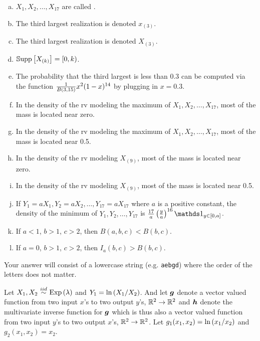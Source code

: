 \documentclass[12pt,landscape]{article}
\newcommand{\instr}{\small Your answer will consist of a lowercase string (e.g. \texttt{aebgd}) where the order of the letters does not matter. \normalsize}
\begin{document}
\begin{enumerate}[(a)]
\item $X_1, X_2, \ldots, X_{17}$ are called .
\item The third largest realization is denoted $x_{(3)}$.
\item The third largest realization is denoted $X_{(3)}$.
\item $\mathbb{S}\text{upp}\left[X_{(k)}\right] = [0, k)$.
\item The probability that the third largest is less than 0.3 can be computed via the function $\frac{1}{B(3, 15)}x^2 (1-x)^{14}$ by plugging in $x=0.3$.
\item In the density of the rv modeling the maximum of $X_1, X_2, \ldots, X_{17}$, most of the mass is located near zero.
\item In the density of the rv modeling the maximum of $X_1, X_2, \ldots, X_{17}$, most of the mass is located near 0.5.
\item In the density of the rv modeling $X_{(9)}$, most of the mass is located near zero.
\item In the density of the rv modeling $X_{(9)}$, most of the mass is located near 0.5.
\item If $Y_1 = aX_1, Y_2 = aX_2, \ldots, Y_{17} = aX_{17}$ where $a$ is a positive constant, the density of the minimum of $Y_1, Y_2, \ldots, Y_{17}$ is $\frac{17}{a}\tothepow{\frac{y}{a}}{16}\indic{y \in [0,a]}$.
\item If $a < 1$, $b > 1$, $c > 2$, then $B(a,b,c) < B(b,c)$.
\item If $a = 0$, $b > 1$, $c > 2$, then $I_a(b,c) > B(b,c)$.
\end{enumerate}
\eenum\instr\pagebreak


\problem{} Let $X_1, X_2 \iid \exponential{\lambda}$ and $Y_1 = \ln\left(X_1 / X_2\right)$. And let $\boldsymbol{g}$ denote a vector valued function from two input $x$'s to two output $y$'s, $\mathbb{R}^2 \rightarrow \mathbb{R}^2$ and $\boldsymbol{h}$ denote the multivariate inverse function for $\boldsymbol{g}$ which is thus also a vector valued function from two input $y$'s to two output $x$'s, $\mathbb{R}^2 \rightarrow \mathbb{R}^2$. Let $g_1(x_1, x_2) = \ln\left(x_1 / x_2\right)$ and $g_2(x_1, x_2) = x_2$.

\vspace{-0.2cm}\benum{} 
\end{document}
